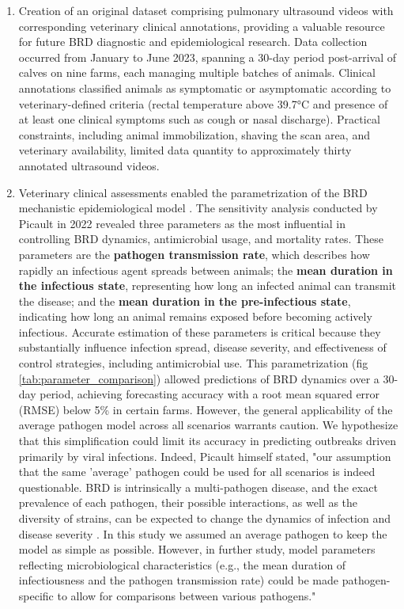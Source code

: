 \begin{enumerate}
    \item Creation of an original dataset comprising pulmonary ultrasound videos with corresponding veterinary clinical annotations, providing a valuable resource for future BRD diagnostic and epidemiological research. Data collection occurred from January to June 2023, spanning a 30-day period post-arrival of calves on nine farms, each managing multiple batches of animals. Clinical annotations classified animals as symptomatic or asymptomatic according to veterinary-defined criteria (rectal temperature above 39.7°C and presence of at least one clinical symptoms such as cough or nasal discharge). Practical constraints, including animal immobilization, shaving the scan area, and veterinary availability, limited data quantity to approximately thirty annotated ultrasound videos. 

    \item Veterinary clinical assessments enabled the parametrization of the BRD mechanistic epidemiological model \cite{picault_modelling_2022}. The sensitivity analysis conducted by Picault in 2022 revealed three parameters as the most influential in controlling BRD dynamics, antimicrobial usage, and mortality rates. These parameters are the \textbf{ pathogen transmission rate}, which describes how rapidly an infectious agent spreads between animals; the \textbf{mean duration in the infectious state}, representing how long an infected animal can transmit the disease; and the \textbf{mean duration in the pre-infectious state}, indicating how long an animal remains exposed before becoming actively infectious. Accurate estimation of these parameters is critical because they substantially influence infection spread, disease severity, and effectiveness of control strategies, including antimicrobial use. This parametrization (fig \ref{tab:parameter_comparison}) allowed predictions of BRD dynamics over a 30-day period, achieving forecasting accuracy with a root mean squared error (RMSE) below 5\% in certain farms. However, the general applicability of the average pathogen model across all scenarios warrants caution. We hypothesize that this simplification could limit its accuracy in predicting outbreaks driven primarily by viral infections. Indeed, Picault himself stated, "our assumption that the same 'average' pathogen could be used for all scenarios is indeed questionable. BRD is intrinsically a multi-pathogen disease, and the exact prevalence of each pathogen, their possible interactions, as well as the diversity of strains, can be expected to change the dynamics of infection and disease severity \cite{Kudirkiene2021, Becker2020}. In this study we assumed an average pathogen to keep the model as simple as possible. However, in further study, model parameters reflecting microbiological characteristics (e.g., the mean duration of infectiousness and the pathogen transmission rate) could be made pathogen-specific to allow for comparisons between various pathogens."


\end{enumerate}
